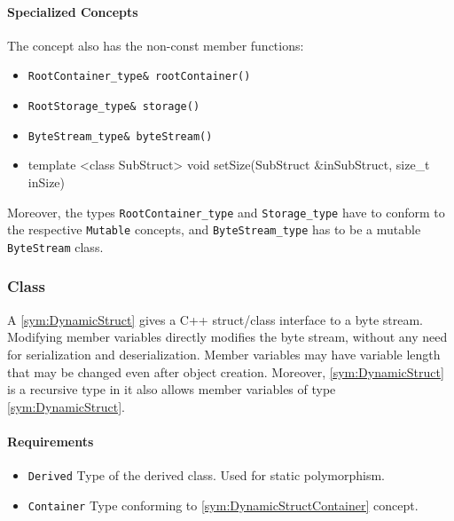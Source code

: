 \paragraph{Specialized Concepts}

The concept  also has the non-const member functions:
\begin{itemize}
	\item \texttt{RootContainer\_type\& rootContainer()}
	\item \texttt{RootStorage\_type\& storage()}
	\item \texttt{ByteStream\_type\& byteStream()}
	\item
		\begin{cppsnippet}
		template <class SubStruct>
		void setSize(SubStruct &inSubStruct, size_t inSize)
		\end{cppsnippet}
\end{itemize}
%
Moreover, the types \texttt{RootContainer\_type} and \texttt{Storage\_type} have to conform to the respective \texttt{Mutable} concepts, and \texttt{ByteStream\_type} has to be a mutable \texttt{ByteStream} class.


\subsubsection[Class DynamicStruct]{Class }

A \ref{sym:DynamicStruct} gives a C++ struct/class interface to a byte stream. Modifying member variables directly modifies the byte stream, without any need for serialization and deserialization. Member variables may have variable length that may be changed even after object creation. Moreover, \ref{sym:DynamicStruct} is a recursive type in it also allows member variables of type \ref{sym:DynamicStruct}.

\paragraph{Requirements}

\begin{itemize}
	\item \texttt{Derived} Type of the derived class. Used for static polymorphism.
	\item \texttt{Container} Type conforming to \ref{sym:DynamicStructContainer} concept.
\end{itemize}

